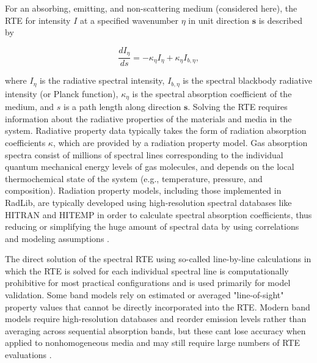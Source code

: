 \documentclass[preprint,12pt]{elsarticle}
\newcounter{bla}
\begin{document}
For an absorbing, emitting, and non-scattering medium (considered here), the RTE for intensity $I$ at a specified wavenumber $\eta$ in unit direction $\mathbf{s}$ is described by
% 
\begin{linenomath}
\begin{equation} \label{e:RTE_general}
    \frac{dI_{\eta}}{ds} = -\kappa_{\eta}I_{\eta} + \kappa_{\eta}I_{b,\eta},
\end{equation}
\end{linenomath}
%
where $I_{\eta}$ is the radiative spectral intensity, $I_{b,\eta}$ is the spectral blackbody radiative intensity (or Planck function), $\kappa_{\eta}$ is the spectral absorption coefficient of the medium, and $s$ is a path length along direction $\mathbf{s}$. Solving the RTE requires information about the radiative properties of the materials and media in the system. Radiative property data typically takes the form of radiation absorption coefficients $\kappa$, which are provided by a radiation property model. Gas absorption spectra consist of millions of spectral lines corresponding to the individual quantum mechanical energy levels of gas molecules, and depends on the local thermochemical state of the system (e.g., temperature, pressure, and composition). Radiation property models, including those implemented in RadLib, are typically developed using high-resolution spectral databases like HITRAN and HITEMP \cite{Rothman_2010} in order to calculate spectral absorption coefficients, thus reducing or simplifying the huge amount of spectral data by using correlations and modeling assumptions \citep{Zhang_2002b}. 

The direct solution of the spectral RTE using so-called line-by-line calculations in which the RTE is solved for each individual spectral line is computationally prohibitive for most practical configurations and is used primarily for model validation. Some band models rely on estimated or averaged "line-of-sight" property values that cannot be directly incorporated into the RTE.
Modern band models require high-resolution databases and reorder emission levels rather than averaging across sequential absorption bands, but these cant lose accuracy when applied to nonhomogeneous media and may still require large numbers of RTE evaluations \citep{Modest_2016}. 
\end{document}
